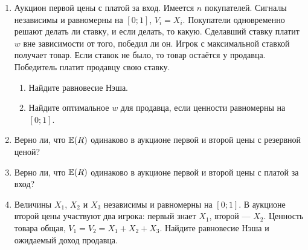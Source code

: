 \begin{enumerate}
\item Аукцион первой цены с платой за вход. Имеется $ n $ покупателей.  Сигналы независимы и равномерны на $ [0;1] $, $ V_{i}=X_{i} $. Покупатели одновременно решают делать ли ставку, и если делать, то какую. Сделавший ставку платит $ w $ вне зависимости от того, победил ли он. Игрок с максимальной ставкой получает товар. Если ставок не было, то товар остаётся у продавца. Победитель платит продавцу свою ставку.
\begin{enumerate}
\item Найдите равновесие Нэша.
\item Найдите оптимальное $ w $ для продавца, если ценности равномерны на $ [0;1] $.
\end{enumerate}

\item Верно ли, что $ \operatorname{\mathbb{E}}(R) $ одинаково в аукционе первой и второй цены с резервной ценой?

\item Верно ли, что $ \operatorname{\mathbb{E}}(R) $ одинаково в аукционе первой и второй цены с платой за вход?

\item Величины $ X_{1} $, $ X_{2} $ и $ X_{3} $ независимы и равномерны на $ [0;1] $. В аукционе второй цены участвуют два игрока: первый знает $ X_{1} $, второй — $ X_{2} $. Ценность товара общая, $ V_{1}=V_{2}=X_{1}+X_{2}+X_{3} $. Найдите равновесие Нэша и ожидаемый доход продавца.


\end{enumerate}
